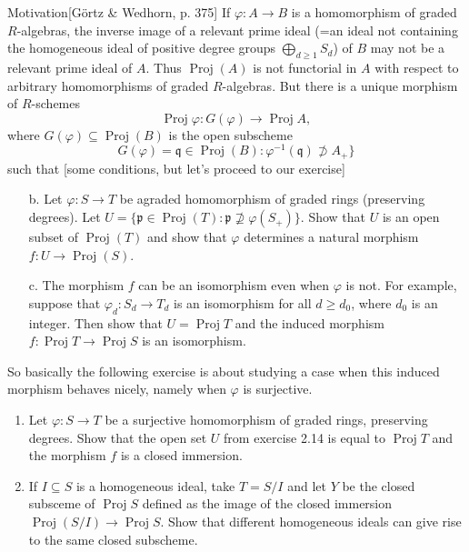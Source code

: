 \begin{thing1}{Motivation}[Görtz \& Wedhorn, p. 375]
	If $\varphi:A\to B$ is a homomorphism of graded $R$-algebras, the inverse image of a relevant prime ideal (=an ideal not containing the homogeneous ideal of positive degree groups $\bigoplus_{d\geq 1} S_d $) of $B$ may not be a relevant prime ideal of $A$. Thus $\operatorname{Proj}(A)$ is not functorial in $A$ with respect to arbitrary homomorphisms of graded $R$-algebras. But there is a unique morphism of $R$-schemes
	\[\operatorname{Proj}\varphi:G(\varphi)\longrightarrow \operatorname{Proj}A,\]
	where $G(\varphi )\subseteq \operatorname{Proj}(B)$ is the open subscheme
	\[G(\varphi )=\mathfrak{q}\in\operatorname{Proj}(B):\varphi^{-1}(\mathfrak{q})\not\supset A_+\}\]
	such that [some conditions, but let's proceed to our exercise]
\end{thing1}

\begin{manualexercise}{2.14}\leavevmode 
	\begin{enumerate}
		\item[b.] Let $\varphi:S\to T$ be agraded homomorphism of graded rings (preserving degrees). Let $U=\{\mathfrak{p}\in\operatorname{Proj}(T):\mathfrak{p}\not\supseteq\varphi(S_+)\}$. Show that $U$ is an open subset of $\operatorname{Proj}(T)$ and show that $\varphi$ determines a natural morphism $f: U\to \operatorname{Proj}(S)$.
	
		\item[c.] The morphism $f$ can be an isomorphism even when $\varphi$ is not. For example, suppose that $\varphi_d:S_d\to T_d$ is an isomorphism for all $d\geq d_0$, where $d_0$ is an integer. Then show that $U=\operatorname{Proj}T$ and the induced morphism $f:\operatorname{Proj}T\to  \operatorname{Proj}S$ is an isomorphism.
	\end{enumerate}
\end{manualexercise}

So basically the following exercise is about studying a case when this induced morphism behaves nicely, namely when $\varphi$ is surjective.

\begin{manualexercise}{3.12}\leavevmode 
	\begin{enumerate}[label=\alph*.]
		\item Let $\varphi:S \to T$ be a surjective homomorphism of graded rings, preserving degrees. Show that the open set $U$ from exercise 2.14 is equal to $\operatorname{Proj}T$ and the morphism $f$ is a closed immersion.

		\item If $I\subseteq S$ is a homogeneous ideal, take $T=S/I$ and let  $Y$ be the closed subsceme of $\operatorname{Proj}S$ defined as the image of the closed immersion $\operatorname{Proj}(S/I)\to \operatorname{Proj}S$. Show that different homogeneous ideals can give rise to the same closed subscheme.
	\end{enumerate}
\end{manualexercise}

